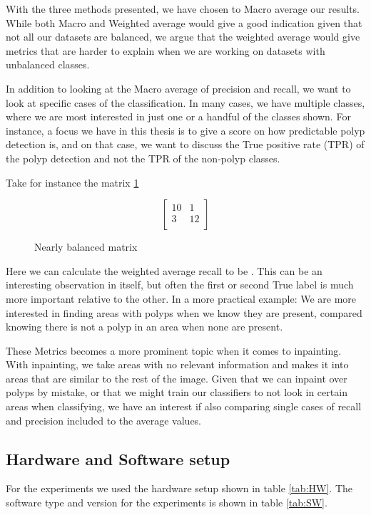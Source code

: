 With the three methods presented, we have chosen to Macro average our results. While both Macro and Weighted average would give a good indication given that not all our datasets are balanced, we argue that the weighted average would give metrics that are harder to explain when we are working on datasets with unbalanced classes.

In addition to looking at the Macro average of precision and recall, we want to look at specific cases of the classification.  In many cases, we have multiple classes, where we are most interested in just one or a handful of the classes shown. 
For instance, a focus we have in this thesis is to give a score on how predictable polyp detection is, and on that case, we want to discuss the True positive rate (TPR) of the polyp detection and not the TPR of the non-polyp classes. 

Take for instance the matrix \ref{mat:exampleMAT}\\
\begin{figure}[h]
    \centering
	\[
	\begin{bmatrix}
	 10 & 1 \\
	 3 & 12 \\
	\end{bmatrix}
	\]
    \caption{Nearly balanced matrix}
    \label{mat:exampleMAT}
\end{figure}



Here we can calculate the weighted average recall to be . This can be an interesting observation in itself, but often the first or second True label is much more important relative to the other.  In a more practical example: We are more interested in finding areas with polyps when we know they are present, compared knowing there is not a polyp in an area when none are present. 

These Metrics becomes a more prominent topic when it comes to inpainting. With inpainting, we take areas with no relevant information and makes it into areas that are similar to the rest of the image. Given that we can inpaint over polyps by mistake, or that we might train our classifiers to not look in certain areas when classifying, we have an interest if also comparing single cases of recall and precision included to the average values.


\subsection{Hardware and Software setup}
For the experiments we used the hardware setup shown in table \ref{tab:HW}.
The software type and version for the experiments is shown in table \ref{tab:SW}.


